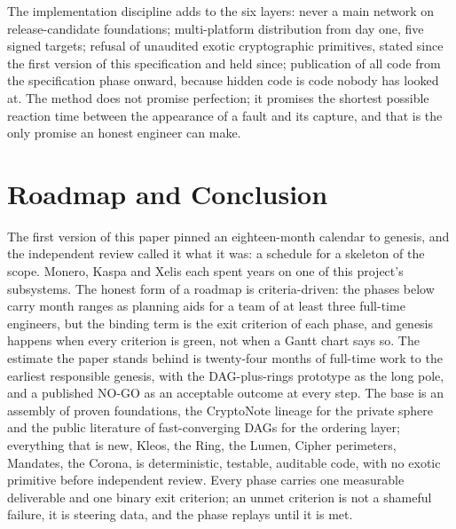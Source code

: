 The implementation discipline adds to the six layers: never a main
network on release-candidate foundations; multi-platform distribution
from day one, five signed targets; refusal of unaudited exotic
cryptographic primitives, stated since the first version of this
specification and held since; publication of all code from the
specification phase onward, because hidden code is code nobody has
looked at. The method does not promise perfection; it promises the
shortest possible reaction time between the appearance of a fault and
its capture, and that is the only promise an honest engineer can make.

\section{Roadmap and Conclusion}\label{sec:roadmap}

The first version of this paper pinned an eighteen-month calendar to
genesis, and the independent review called it what it was: a schedule for a
skeleton of the scope. Monero, Kaspa and Xelis each spent years on one
of this project's subsystems. The honest form of a roadmap is
criteria-driven: the phases below carry month ranges as planning aids
for a team of at least three full-time engineers, but the binding
term is the exit criterion of each phase, and genesis happens when
every criterion is green, not when a Gantt chart says so. The estimate
the paper stands behind is twenty-four months of full-time work to the
earliest responsible genesis, with the DAG-plus-rings prototype as the
long pole, and a published NO-GO as an acceptable outcome at every
step. The base is an assembly of proven foundations, the
CryptoNote lineage for the private sphere and the public literature of
fast-converging DAGs for the ordering layer; everything that is new,
Kleos, the Ring, the Lumen, Cipher perimeters, Mandates, the Corona,
is
deterministic, testable, auditable code, with no exotic primitive
before independent review. Every
phase carries one measurable deliverable and one binary exit criterion;
an unmet criterion is not a shameful failure, it is steering data, and
the phase replays until it is met.

